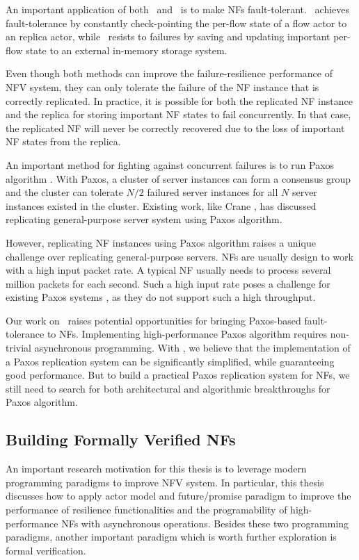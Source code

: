 An important application of both \nfactor~and \netstar~is to make NFs fault-tolerant. \nfactor~achieves fault-tolerance by constantly check-pointing the per-flow state of a flow actor to an replica actor, while \netstar~resists to failures by saving and updating important per-flow state to an external in-memory storage system.

Even though both methods can improve the failure-resilience performance of NFV system, they can only tolerate the failure of the NF instance that is correctly replicated. In practice, it is possible for both the replicated NF instance and the replica for storing important NF states to fail concurrently. In that case, the replicated NF will never be correctly recovered due to the loss of important NF states from the replica.

An important method for fighting against concurrent failures is to run Paxos algorithm \cite{lamport1998part}. With Paxos, a cluster of server instances can form a consensus group and the cluster can tolerate $N/2$ failured server instances for all $N$ server instances existed in the cluster. Existing work, like Crane \cite{cui2015p}, has discussed replicating general-purpose server system using Paxos algorithm.

However, replicating NF instances using Paxos algorithm raises a unique challenge over replicating general-purpose servers. NFs are usually design to work with a high input packet rate. A typical NF usually needs to process several million packets for each second. Such a high input rate poses a challenge for existing Paxos systems \cite{poke2015dare, 199299}, as they do not support such a high throughput.

Our work on \netstar~raises potential opportunities for bringing Paxos-based fault-tolerance to NFs. Implementing high-performance Paxos algorithm requires non-trivial asynchronous programming. With \netstar, we believe that the implementation of a Paxos replication system can be significantly simplified, while guaranteeing good performance. But to build a practical Paxos replication system for NFs, we still need to search for both architectural and algorithmic breakthroughs for Paxos algorithm.

\subsection{Building Formally Verified NFs}

An important research motivation for this thesis is to leverage modern programming paradigms to improve NFV system. In particular, this thesis discusses how to apply actor model and future/promise paradigm to improve the performance of resilience functionalities and the programability of high-performance NFs with asynchronous operations. Besides these two programming paradigms, another important paradigm which is worth further exploration is formal verification.

